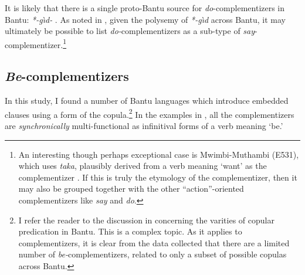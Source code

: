 \documentclass[output=paper,colorlinks,citecolor=brown,
]{langscibook}
\begin{document}

It is likely that there is a single proto-Bantu source for \textit{do}-complementizers in Bantu: \textit{*-g{\`\i}d-} \citep{Bastinetal:2002}. As noted in \citet{DevosBostoen:2012}, given the polysemy of \textit{*-g{\`\i}d} across Bantu, it may ultimately be possible to list \textit{do-}complementizers as a sub-type of \textit{say}-complementizer.\footnote{An interesting though perhaps exceptional case is Mwimbi-Muthambi (E531), which uses \textit{taka}, plausibly derived from a verb meaning `want' as the complementizer \citep{Kaburo:2022}. If this is truly the etymology of the complementizer, then it may also be grouped together with the other ``action''-oriented complementizers like \textit{say} and \textit{do}.} 









\subsection{\textit{Be}-complementizers}\label{sec:gluckman:becompsection}

In this study, I found a number of Bantu languages which introduce embedded clauses using a form of the copula.\footnote{I refer the reader to the discussion in \citet{Gibsonetal:2018, Finholt:2024} concerning the varities of copular predication in Bantu. This is a complex topic. As it applies to complementizers, it is clear from the data collected that there are a limited number of \textit{be-}complementizers, related to only a subset of possible copulas across Bantu.} In the examples in , all the complementizers are \textit{synchronically} multi-functional as infinitival forms of a verb meaning `be.'
\end{document}
